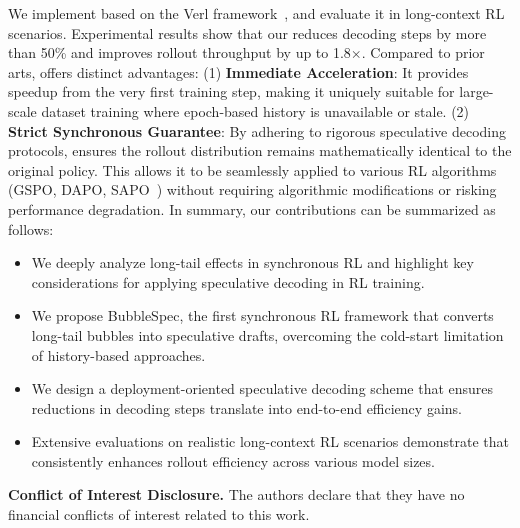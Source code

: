 
We implement \model based on the Verl framework~\cite{sheng2025hybridflow}, and evaluate it in long-context RL scenarios. 
Experimental results show that our \model reduces decoding steps by more than 50\% and improves rollout throughput by up to 1.8$\times$. 
Compared to prior arts, \model offers distinct advantages: 
(1) \textbf{Immediate Acceleration}: It provides speedup from the very first training step, making it uniquely suitable for large-scale dataset training where epoch-based history is unavailable or stale. 
(2) \textbf{Strict Synchronous Guarantee}: By adhering to rigorous speculative decoding protocols, \model ensures the rollout distribution remains mathematically identical to the original policy. 
This allows it to be seamlessly applied to various RL algorithms (\eg GSPO, DAPO, SAPO~\cite{gao2025soft_sapo, yu2025dapo, zheng2025gspo}) without requiring algorithmic modifications or risking performance degradation. In summary, our contributions can be summarized as follows:
\begin{itemize}
    \item We deeply analyze long-tail effects in synchronous RL and highlight key considerations for applying speculative decoding in RL training.
    \item We propose BubbleSpec, the first synchronous RL framework that converts long-tail bubbles into speculative drafts, overcoming the cold-start limitation of history-based approaches.
    \item We design a deployment-oriented speculative decoding scheme that ensures reductions in decoding steps translate into end-to-end efficiency gains.
    \item Extensive evaluations on realistic long-context RL scenarios demonstrate that \model consistently enhances rollout efficiency across various model sizes.
\end{itemize}

\textbf{Conflict of Interest Disclosure.} The authors declare that they have no financial conflicts of interest related to this work.
